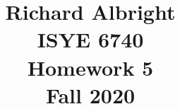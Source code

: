 \documentclass[twoside,10pt]{article}
\begin{document}
\title{
Richard Albright\\
ISYE 6740\\
Homework 5\\ 
Fall 2020\\}

\date{}
\maketitle




\end{document}
